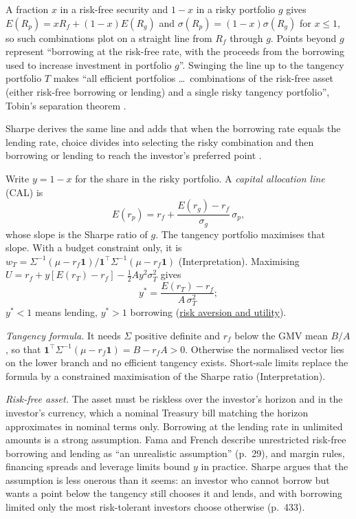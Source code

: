 \begin{qfmethod}\label{meth:capital-allocation-line}
 A fraction $x$ in a risk-free security and $1-x$ in a risky portfolio $g$ gives $E(R_p)=xR_f+(1-x)E(R_g)$ and $\sigma(R_p)=(1-x)\sigma(R_g)$ for $x\le1$, so such combinations plot on a straight line from $R_f$ through $g$. Points beyond $g$ represent ``borrowing at the risk-free rate, with the proceeds from the borrowing used to increase investment in portfolio $g$''. Swinging the line up to the tangency portfolio $T$ makes ``all efficient portfolios \dots\ combinations of the risk-free asset (either risk-free borrowing or lending) and a single risky tangency portfolio'', Tobin's separation theorem \citep[\emph{JEP} 18(3), 2004, pp.~27--28 and n.~2]{capm-theory-evidence-2004}.

Sharpe derives the same line and adds that when the borrowing rate equals the lending rate, choice divides into selecting the risky combination and then borrowing or lending to reach the investor's preferred point \citep[\emph{Journal of Finance} 19(3), 1964, pp.~432--433]{capital-asset-prices-1964}.

 Write $y=1-x$ for the share in the risky portfolio. A \emph{capital allocation line} (CAL) is
\[ E(r_p)=r_f+\frac{E(r_g)-r_f}{\sigma_g}\,\sigma_p, \]
whose slope is the Sharpe ratio of $g$. The tangency portfolio maximises that slope. With a budget constraint only, it is $w_T=\Sigma^{-1}(\mu-r_f\mathbf 1)/\mathbf 1^\top\Sigma^{-1}(\mu-r_f\mathbf 1)$ (Interpretation). Maximising $U=r_f+y[E(r_T)-r_f]-\tfrac12Ay^2\sigma_T^2$ gives
\[ y^\ast=\frac{E(r_T)-r_f}{A\,\sigma_T^2}; \]
$y^\ast<1$ means lending, $y^\ast>1$ borrowing (\hyperref[def:risk-aversion-utility]{risk aversion and utility}).

 \emph{Tangency formula.} It needs $\Sigma$ positive definite and $r_f$ below the GMV mean $B/A$, so that $\mathbf 1^\top\Sigma^{-1}(\mu-r_f\mathbf 1)=B-r_fA>0$. Otherwise the normalised vector lies on the lower branch and no efficient tangency exists. Short-sale limits replace the formula by a constrained maximisation of the Sharpe ratio (Interpretation).

\emph{Risk-free asset.} The asset must be riskless over the investor's horizon and in the investor's currency, which a nominal Treasury bill matching the horizon approximates in nominal terms only. Borrowing at the lending rate in unlimited amounts is a strong assumption. Fama and French describe unrestricted risk-free borrowing and lending as ``an unrealistic assumption'' (p.~29), and margin rules, financing spreads and leverage limits bound $y$ in practice. Sharpe argues that the assumption is less onerous than it seems: an investor who cannot borrow but wants a point below the tangency still chooses it and lends, and with borrowing limited only the most risk-tolerant investors choose otherwise (p.~433).


\end{qfmethod}
